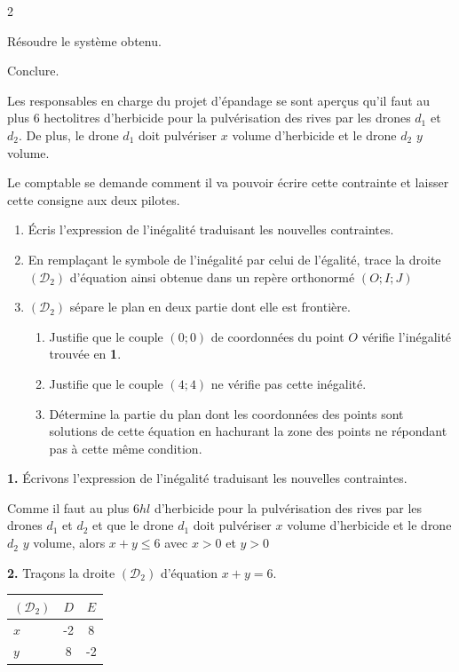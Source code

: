 \begin{multicols*}{2}
{  		 Résoudre le système obtenu.
  		
  		 Conclure.
  		
  	}
  	
  	
  	Les responsables en charge du projet d'épandage se sont aperçus qu'il faut au plus $6$ hectolitres d'herbicide pour la pulvérisation des rives par les drones $d_{1}$ et $d_{2}$. 
  	De plus, le drone $d_{1}$ doit pulvériser $x$ volume d'herbicide et le drone $d_{2}$ $y$ volume. 
  	
  	Le comptable se demande comment il va pouvoir écrire cette contrainte et laisser cette consigne aux deux pilotes.
  	
  	
  	\begin{enumerate}
  		\item Écris l'expression de l'inégalité traduisant les nouvelles contraintes.
  		\item En remplaçant le symbole de l'inégalité par celui de l'égalité, trace la droite $(\mathcal{D}_{2})$ d'équation ainsi obtenue dans un repère orthonormé $\left(O; I;J\right)$
  		\item $(\mathcal{D}_{2})$ sépare le plan en deux partie dont elle est frontière.
  		\begin{enumerate}
  			\item Justifie que le couple $(0;0)$ de coordonnées du point $O$ vérifie l'inégalité trouvée en \textbf{1}.
  			\item Justifie que le couple $(4;4)$ ne vérifie pas  cette inégalité.
  			\item Détermine la partie du plan dont les coordonnées des points sont solutions de cette équation en hachurant la zone des points ne répondant pas à cette même condition. 
  		\end{enumerate} 
  	\end{enumerate}
  	\dure 
  	\resul
  	\textbf{1.} Écrivons l'expression de l'inégalité traduisant les nouvelles contraintes.
  	
  	Comme il faut au plus $6 hl$ d'herbicide pour la pulvérisation des rives par les drones $d_{1}$ et $d_{2}$ et  que le drone $d_{1}$ doit pulvériser $x$ volume d'herbicide et le drone $d_{2}$ $y$ volume, alors $x+y\leqslant 6$ avec $x> 0$ et $y> 0$
  	
  	\textbf{2.} Traçons la droite $(\mathcal{D}_{2})$ d'équation $x+y=6$.
  	\begin{tabular}{|l|c|c|}
  		\hline
  		$(\mathcal{D}_{2})$ & $D$ & $E$ \\
  		\hline
  		$x$ & -2 & 8\\ 
  		\hline
  		$y$ & 8 & -2\\
  		\hline 
  	\end{tabular}
  	

\end{multicols*}
